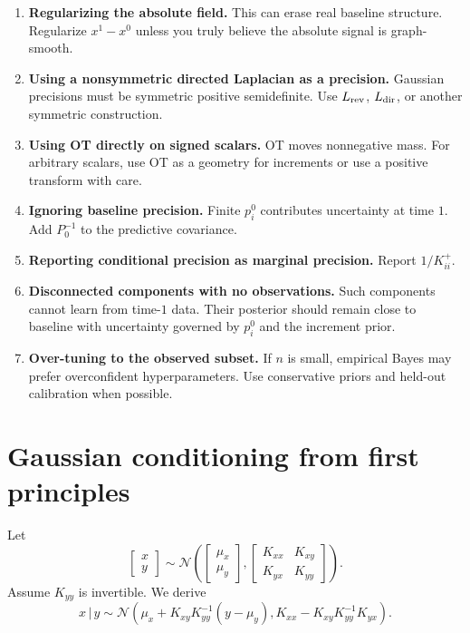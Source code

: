 \documentclass[11pt]{article}
\numberwithin{equation}{section}
\newcommand{\given}{\,|\,}
\begin{document}
\begin{enumerate}[label=(\alph*),leftmargin=2em]
  \item \textbf{Regularizing the absolute field.}  This can erase real baseline structure.  Regularize $x^1-x^0$ unless you truly believe the absolute signal is graph-smooth.
  \item \textbf{Using a nonsymmetric directed Laplacian as a precision.}  Gaussian precisions must be symmetric positive semidefinite.  Use $L_{\rm rev}$, $L_{\rm dir}$, or another symmetric construction.
  \item \textbf{Using OT directly on signed scalars.}  OT moves nonnegative mass.  For arbitrary scalars, use OT as a geometry for increments or use a positive transform with care.
  \item \textbf{Ignoring baseline precision.}  Finite $p_i^0$ contributes uncertainty at time $1$.  Add $P_0^{-1}$ to the predictive covariance.
  \item \textbf{Reporting conditional precision as marginal precision.}  Report $1/K^+_{ii}$.
  \item \textbf{Disconnected components with no observations.}  Such components cannot learn from time-$1$ data.  Their posterior should remain close to baseline with uncertainty governed by $p_i^0$ and the increment prior.
  \item \textbf{Over-tuning to the observed subset.}  If $n$ is small, empirical Bayes may prefer overconfident hyperparameters.  Use conservative priors and held-out calibration when possible.
\end{enumerate}

\appendix

\section{Gaussian conditioning from first principles}
\label{app:gaussian-conditioning}

Let
\[
  \begin{bmatrix}x\\y\end{bmatrix}
  \sim\mathcal N\left(
  \begin{bmatrix}\mu_x\\\mu_y\end{bmatrix},
  \begin{bmatrix}
    K_{xx}&K_{xy}\\
    K_{yx}&K_{yy}
  \end{bmatrix}
  \right).
\]
Assume $K_{yy}$ is invertible.  We derive
\begin{equation}
  x\given y
  \sim\mathcal N\left(
  \mu_x+K_{xy}K_{yy}^{-1}(y-\mu_y),
  K_{xx}-K_{xy}K_{yy}^{-1}K_{yx}
  \right).
  \label{eq:joint-conditioning-formula}
\end{equation}
\end{document}
